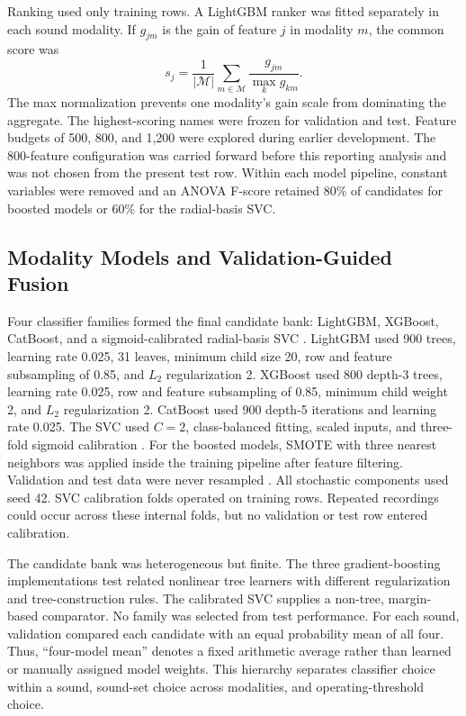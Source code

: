 \documentclass[conference]{IEEEtran}
\begin{document}
Ranking used only training rows. A LightGBM ranker was fitted separately in
each sound modality. If $g_{jm}$ is the gain of feature $j$ in modality $m$,
the common score was
\begin{equation}
s_j=\frac{1}{|\mathcal{M}|}\sum_{m\in\mathcal{M}}
\frac{g_{jm}}{\max_k g_{km}}.
\label{eq:rank}
\end{equation}
The max normalization prevents one modality's gain scale from dominating the
aggregate. The \SelectedFeatureCount{} highest-scoring names were frozen for
validation and test. Feature budgets of 500, 800, and 1,200 were explored
during earlier development. The 800-feature configuration was carried forward
before this reporting analysis and was not chosen from the present test row.
Within each model pipeline, constant variables were removed
and an ANOVA F-score retained 80\% of candidates for boosted models or 60\%
for the radial-basis SVC.

\subsection{Modality Models and Validation-Guided Fusion}

Four classifier families formed the final candidate bank: LightGBM, XGBoost,
CatBoost, and a sigmoid-calibrated radial-basis SVC
\cite{ke2017lightgbm,chen2016xgboost,prokhorenkova2018catboost,cortes1995svm}.
LightGBM used 900 trees, learning rate 0.025, 31 leaves, minimum child size 20,
row and feature subsampling of 0.85, and $L_2$ regularization 2. XGBoost used
800 depth-3 trees, learning rate 0.025, row and feature subsampling of 0.85,
minimum child weight 2, and $L_2$ regularization 2. CatBoost used 900 depth-5
iterations and learning rate 0.025. The SVC used $C=2$, class-balanced fitting,
scaled inputs, and three-fold sigmoid calibration
\cite{niculescu2005calibration}. For the boosted models, SMOTE with three
nearest neighbors was applied inside the training pipeline after feature
filtering. Validation and test data were never resampled \cite{chawla2002smote}.
All stochastic components used seed 42. SVC calibration folds operated on
training rows. Repeated recordings could occur across these internal folds, but
no validation or test row entered calibration.

The candidate bank was heterogeneous but finite. The three gradient-boosting
implementations test related nonlinear tree learners with different
regularization and tree-construction rules. The calibrated SVC supplies a
non-tree, margin-based comparator. No family was selected from test
performance. For each sound, validation compared each candidate with an equal
probability mean of all four. Thus, ``four-model mean'' denotes a fixed
arithmetic average rather than learned or manually assigned model weights.
This hierarchy separates classifier choice within a sound, sound-set choice
across modalities, and operating-threshold choice.
\end{document}
